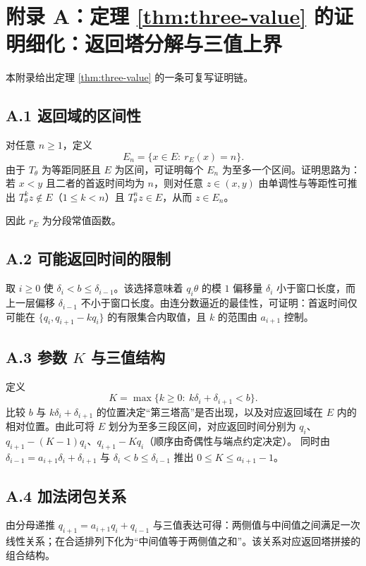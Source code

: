 \section{附录 A：定理 \ref{thm:three-value} 的证明细化：返回塔分解与三值上界}
\label{app:proof-thm31}

本附录给出定理 \ref{thm:three-value} 的一条可复写证明链。

\subsection*{A.1 返回域的区间性}

对任意 $n\ge 1$，定义
\[
E_n=\{x\in E:\ r_E(x)=n\}.
\]
由于 $T_\theta$ 为等距同胚且 $E$ 为区间，可证明每个 $E_n$ 为至多一个区间。证明思路为：若 $x<y$ 且二者的首返时间均为 $n$，则对任意 $z\in(x,y)$ 由单调性与等距性可推出 $T_\theta^k z\notin E$（$1\le k<n$）且 $T_\theta^n z\in E$，从而 $z\in E_n$。

因此 $r_E$ 为分段常值函数。

\subsection*{A.2 可能返回时间的限制}

取 $i\ge 0$ 使 $\delta_i<b\le \delta_{i-1}$。该选择意味着 $q_i\theta$ 的模 $1$ 偏移量 $\delta_i$ 小于窗口长度，而上一层偏移 $\delta_{i-1}$ 不小于窗口长度。由连分数逼近的最佳性，可证明：首返时间仅可能在 $\{q_i, q_{i+1}-k q_i\}$ 的有限集合内取值，且 $k$ 的范围由 $a_{i+1}$ 控制。

\subsection*{A.3 参数 $K$ 与三值结构}

定义
\[
K=\max\{k\ge 0:\ k\delta_i+\delta_{i+1}<b\}.
\]
比较 $b$ 与 $k\delta_i+\delta_{i+1}$ 的位置决定“第三塔高”是否出现，以及对应返回域在 $E$ 内的相对位置。由此可将 $E$ 划分为至多三段区间，对应返回时间分别为 $q_i$、$q_{i+1}-(K-1)q_i$、$q_{i+1}-Kq_i$（顺序由奇偶性与端点约定决定）。
同时由 $\delta_{i-1}=a_{i+1}\delta_i+\delta_{i+1}$ 与 $\delta_i<b\le\delta_{i-1}$ 推出 $0\le K\le a_{i+1}-1$。

\subsection*{A.4 加法闭包关系}

由分母递推 $q_{i+1}=a_{i+1}q_i+q_{i-1}$ 与三值表达可得：两侧值与中间值之间满足一次线性关系；在合适排列下化为“中间值等于两侧值之和”。该关系对应返回塔拼接的组合结构。

